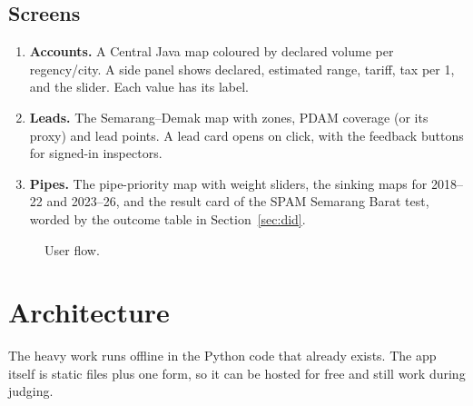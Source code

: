 \subsection{Screens}

\begin{enumerate}
\item \textbf{Accounts.} A Central Java map coloured by declared volume per regency/city. A side panel
  shows declared, estimated range, tariff, tax per 1\Mm, and the slider. Each value has its label.
\item \textbf{Leads.} The Semarang--Demak map with zones, PDAM coverage (or its proxy) and lead points.
  A lead card opens on click, with the feedback buttons for signed-in inspectors.
\item \textbf{Pipes.} The pipe-priority map with weight sliders, the sinking maps for 2018--22 and
  2023--26, and the result card of the SPAM Semarang Barat test, worded by the outcome table in
  Section~\ref{sec:did}.
\end{enumerate}

\begin{figure}[H]
\centering
{}
\caption{User flow.}
\end{figure}

\section{Architecture}\label{sec:arch}

\begin{inshort}
The heavy work runs offline in the Python code that already exists. The app itself is static files plus
one form, so it can be hosted for free and still work during judging.
\end{inshort}

